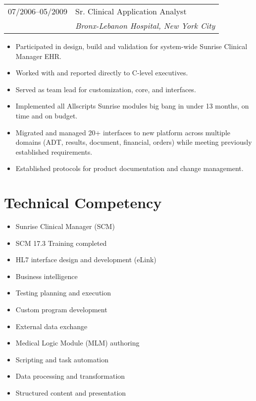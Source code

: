 \documentclass[letter,11pt,DIV=20]{scrartcl}
\begin{document}
\begin{tabu}{r|X}
  \textsc{07/2006--05/2009} & Sr. Clinical Application Analyst \\
  & \emph{Bronx-Lebanon Hospital, New York City} \\
\end{tabu}
{\small
\begin{itemize}[topsep=0pt,nosep,noitemsep]
     \item	Participated in design, build and validation for system-wide Sunrise Clinical Manager EHR.
    \item	Worked with and reported directly to C-level executives.
    \item	Served as team lead for customization, core, and interfaces.
    \item	Implemented all Allscripts Sunrise modules big bang in under 13 months, on time and on budget.
    \item	Migrated and managed 20+ interfaces to new platform across multiple domains (ADT, results, document, financial, orders) while meeting previously established requirements.
    \item	Established protocols for product documentation and change management.
 \end{itemize}
 }

\section{Technical Competency}
\begin{multicols}{2}
\vspace{-0.5em}
{\small
\begin{itemize}[topsep=0pt,nosep,noitemsep,leftmargin=1em]
    \item Sunrise Clinical Manager (SCM)
    \item SCM 17.3 Training completed
    \item HL7 interface design and development (eLink)
    \item Business intelligence
    \item Testing planning and execution
    \item Custom program development
    \item External data exchange
    \item Medical Logic Module (MLM) authoring
    \item Scripting and task automation
    \item Data processing and transformation
    \item Structured content and presentation
\end{itemize}
}
\end{multicols}
\end{document}

